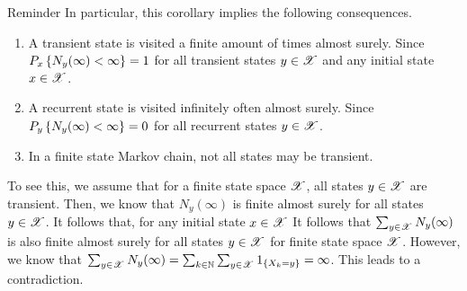 \documentclass[12pt,aspectratio=169]{beamer}
\begin{document}
\begin{frame}
\begin{block}{Reminder}
In particular, this corollary implies the following consequences. 
\begin{enumerate}[i\_]
	\item A transient state is visited a finite amount of times almost surely. 
	Since $P_x\left\{N_y(\infty) < \infty\right\} = 1$ for all transient states $y \in \mathscr{X}$ and any initial state $x \in \mathscr{X}$. 
	\item<2-> A recurrent state is visited infinitely often almost surely. 
	Since $P_y\left\{N_y(\infty) < \infty\right\} = 0$ for all recurrent states $y \in \mathscr{X}$. 
    
	\item<3-> In a finite state Markov chain, not all states may be transient. 
\end{enumerate} 
\end{block}
\end{frame}

\begin{frame}
\begin{Proof}
	To see this, we assume that for a finite state space $\mathscr{X}$, all states $y \in \mathscr{X}$ are transient. 
	Then, we know that $N_y(\infty)$ is finite almost surely for all states $y \in \mathscr{X}$. 
	It follows that, for any initial state $x \in \mathscr{X}$
It follows that $\sum_{y \in \mathscr{X}}N_y(\infty)$ is also finite almost surely for all states $y \in \mathscr{X}$ for finite state space $\mathscr{X}$. 
However, we know that $\sum_{y \in \mathscr{X}}N_y(\infty) = \sum_{k \in \mathbb{N}}\sum_{y \in \mathscr{X}}1_{\left\{X_k = y\right\}} = \infty$. 
This leads to a contradiction. 
\end{Proof}
\end{frame}
\end{document}
